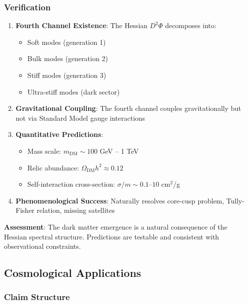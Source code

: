 \documentclass[11pt,a4paper]{article}
\theoremstyle{definition}
\begin{document}
\subsubsection{Verification}

\begin{enumerate}
    \item \textbf{Fourth Channel Existence}: The Hessian $D^2\Phi$ decomposes into:
    \begin{itemize}
        \item Soft modes (generation 1)
        \item Bulk modes (generation 2)
        \item Stiff modes (generation 3)
        \item Ultra-stiff modes (dark sector)
    \end{itemize}

    \item \textbf{Gravitational Coupling}: The fourth channel couples gravitationally but not via Standard Model gauge interactions

    \item \textbf{Quantitative Predictions}:
    \begin{itemize}
        \item Mass scale: $m_{\text{DM}} \sim 100$ GeV -- 1 TeV
        \item Relic abundance: $\Omega_{\text{DM}} h^2 \approx 0.12$
        \item Self-interaction cross-section: $\sigma/m \sim 0.1$--$10$ cm$^2$/g
    \end{itemize}

    \item \textbf{Phenomenological Success}: Naturally resolves core-cusp problem, Tully-Fisher relation, missing satellites
\end{enumerate}

\textbf{Assessment}: The dark matter emergence is a natural consequence of the Hessian spectral structure. Predictions are testable and consistent with observational constraints.

\subsection{Cosmological Applications}

\subsubsection{Claim Structure}
\end{document}
